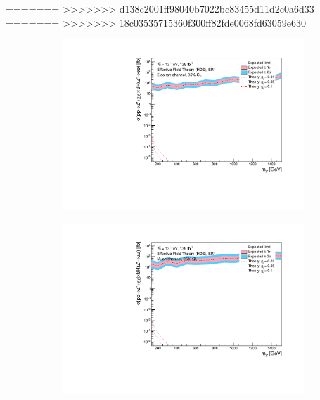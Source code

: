 \documentclass[12pt, a4paper]{book}
\begin{document}
=======
>>>>>>> d138c2001ff98040b7022bc83455d11d2c0a6d33
=======
>>>>>>> 18c03535715360f300ff82fde0068fd63059e630
\begin{figure}[!ht]
	\centering
	\begin{subfigure}[b]{0.49\textwidth}
      \centering
      \includegraphics[width=1\textwidth]{Limits/Model_independent/50-100/EFT_HDS/mass_exclusion_ee.pdf}
   \end{subfigure}
   \hfill
   \begin{subfigure}[b]{0.49\textwidth}
      \centering
      \includegraphics[width=1\textwidth]{Limits/Model_independent/50-100/EFT_HDS/mass_exclusion_uu.pdf}
   \end{subfigure}
   \hfill
   \begin{subfigure}[b]{0.49\textwidth}
      \centering

\end{subfigure}
\end{figure}
\end{document}
